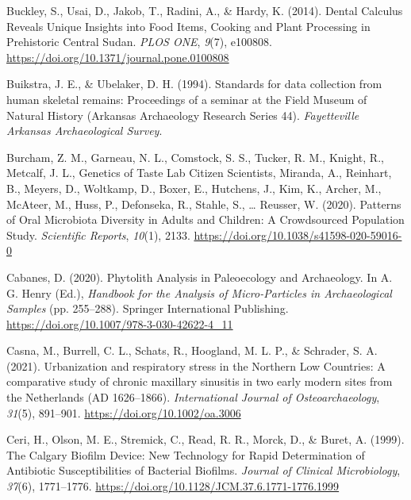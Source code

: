 \documentclass[
  letterpaper,
]{book}
\newlength{\cslhangindent}
\newlength{\cslentryspacingunit} %
\newenvironment{CSLReferences}[2] %
 {%
  \setlength{\parindent}{0pt}
  \ifodd #1
  \let\oldpar\par
  \def\par{\hangindent=\cslhangindent\oldpar}
  \fi
  \setlength{\parskip}{#2\cslentryspacingunit}
 }%
 {}
\begin{document}
\begin{CSLReferences}{1}{0}
\leavevmode{}%
Buckley, S., Usai, D., Jakob, T., Radini, A., \& Hardy, K. (2014).
Dental {Calculus Reveals Unique Insights} into {Food Items}, {Cooking}
and {Plant Processing} in {Prehistoric Central Sudan}. \emph{PLOS ONE},
\emph{9}(7), e100808. \url{https://doi.org/10.1371/journal.pone.0100808}

\leavevmode{}%
Buikstra, J. E., \& Ubelaker, D. H. (1994). Standards for data
collection from human skeletal remains: {Proceedings} of a seminar at
the {Field Museum} of {Natural History} ({Arkansas Archaeology Research
Series} 44). \emph{Fayetteville Arkansas Archaeological Survey}.

\leavevmode{}%
Burcham, Z. M., Garneau, N. L., Comstock, S. S., Tucker, R. M., Knight,
R., Metcalf, J. L., Genetics of Taste Lab Citizen Scientists, Miranda,
A., Reinhart, B., Meyers, D., Woltkamp, D., Boxer, E., Hutchens, J.,
Kim, K., Archer, M., McAteer, M., Huss, P., Defonseka, R., Stahle, S.,
\ldots{} Reusser, W. (2020). Patterns of {Oral Microbiota Diversity} in
{Adults} and {Children}: {A Crowdsourced Population Study}.
\emph{Scientific Reports}, \emph{10}(1), 2133.
\url{https://doi.org/10.1038/s41598-020-59016-0}

\leavevmode{}%
Cabanes, D. (2020). Phytolith {Analysis} in {Paleoecology} and
{Archaeology}. In A. G. Henry (Ed.), \emph{Handbook for the {Analysis}
of {Micro-Particles} in {Archaeological Samples}} (pp. 255--288).
{Springer International Publishing}.
\url{https://doi.org/10.1007/978-3-030-42622-4_11}

\leavevmode{}%
Casna, M., Burrell, C. L., Schats, R., Hoogland, M. L. P., \& Schrader,
S. A. (2021). Urbanization and respiratory stress in the {Northern Low
Countries}: {A} comparative study of chronic maxillary sinusitis in two
early modern sites from the {Netherlands} ({AD} 1626--1866).
\emph{International Journal of Osteoarchaeology}, \emph{31}(5),
891--901. \url{https://doi.org/10.1002/oa.3006}

\leavevmode{}%
Ceri, H., Olson, M. E., Stremick, C., Read, R. R., Morck, D., \& Buret,
A. (1999). The {Calgary Biofilm Device}: {New Technology} for {Rapid
Determination} of {Antibiotic Susceptibilities} of {Bacterial Biofilms}.
\emph{Journal of Clinical Microbiology}, \emph{37}(6), 1771--1776.
\url{https://doi.org/10.1128/JCM.37.6.1771-1776.1999}


\end{CSLReferences}
\end{document}
